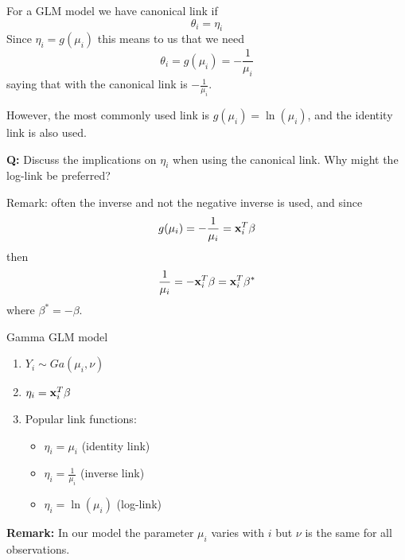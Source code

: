 \documentclass[
  ignorenonframetext,
]{beamer}
\providecommand{\tightlist}{%
  \setlength{\itemsep}{0pt}\setlength{\parskip}{0pt}}
\begin{document}
\begin{frame}
For a GLM model we have canonical link if \[\theta_i=\eta_i\] Since
\(\eta_i=g(\mu_i)\) this means to us that we need
\[\theta_i=g(\mu_i)=-\frac{1}{\mu_i}\] saying that with the canonical
link is \(-\frac{1}{\mu_i}\).

However, the most commonly used link is \(g(\mu_i)=\ln(\mu_i)\), and the
identity link is also used.

\textbf{Q:} Discuss the implications on \(\eta_i\) when using the
canonical link. Why might the log-link be preferred?
\end{frame}

\begin{frame}
Remark: often the inverse and not the negative inverse is used, and
since \[g(\mu_i)=-\frac{1}{\mu_i}={\bf x}_i^T\beta\] then
\[\frac{1}{\mu_i}=-{\bf x}_i^T\beta={\bf x}_i^T\beta^*\] where
\(\beta^*=-\beta\).
\end{frame}

\begin{frame}
\begin{block}{Gamma GLM model}
\protect\hypertarget{gamma-glm-model}{}
\begin{enumerate}
\item
  \(Y_i \sim Ga(\mu_i,\nu)\)
\item
  \(\eta_i={\bf x}_i^T\beta\)
\item
  Popular link functions:

  \begin{itemize}
  \tightlist
  \item
    \(\eta_i=\mu_i\) (identity link)
  \item
    \(\eta_i=\frac{1}{\mu_i}\) (inverse link)
  \item
    \(\eta_i=\ln(\mu_i)\) (log-link)
  \end{itemize}
\end{enumerate}

\textbf{Remark:} In our model the parameter \(\mu_i\) varies with \(i\)
but \(\nu\) is the same for all observations.
\end{block}
\end{frame}
\end{document}
